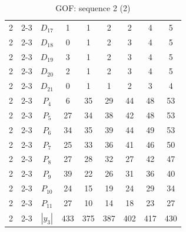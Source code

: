 \documentclass[a4paper, 11pt]{report}
\theoremstyle{definition}
\begin{document}
\begin{table}[h!]
\begin{tabular}{c| c | c | c | c |c |c |c |c }
            2 & 2-3 & $D_{17}$ & 1 &  1& 2& 2& 4& 5 \\
            2 & 2-3 & $D_{18}$ & 0 &  1& 2& 3& 4& 5 \\
            2 & 2-3 & $D_{19}$ & 3 &  1& 2& 3& 4& 5 \\
            2 & 2-3 & $D_{20}$ & 2 &  1& 2& 3& 4& 5 \\
            2 & 2-3 & $D_{21}$ & 0 &  1& 1& 2& 3& 4 \\
            2 & 2-3 & $P_4$ & 6 & 35& 29& 44& 48& 53 \\
            2 & 2-3 & $P_5$ & 27 & 34& 38& 42& 48& 53 \\
            2 & 2-3 & $P_6$ & 34 & 35& 39& 44& 49& 53 \\
            2 & 2-3 & $P_7$ & 25 & 33& 36& 41& 46& 50 \\
            2 & 2-3 & $P_8$ & 27 & 28& 32& 27& 42& 47 \\
            2 & 2-3 & $P_9$ & 39 & 22& 26& 31& 36& 40 \\
            2 & 2-3 & $P_{10}$ & 24 & 15& 19& 24& 29& 34 \\
            2 & 2-3 & $P_{11}$ & 27 & 10& 14& 18& 23& 27 \\
            2 & 2-3 & $|y_3|$ & 433 &  375& 387& 402& 417& 430 \\
        \end{tabular}
        \caption{GOF: sequence 2 (2)}
    \end{table}
\clearpage
\end{document}
